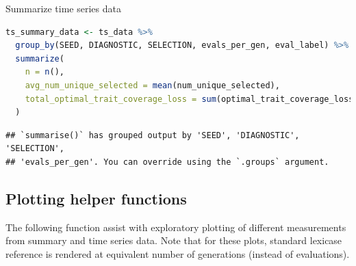 \documentclass[
]{book}
\begin{document}
Summarize time series data

\begin{lstlisting}[language=R]
ts_summary_data <- ts_data %>%
  group_by(SEED, DIAGNOSTIC, SELECTION, evals_per_gen, eval_label) %>%
  summarize(
    n = n(),
    avg_num_unique_selected = mean(num_unique_selected),
    total_optimal_trait_coverage_loss = sum(optimal_trait_coverage_loss)
  )
\end{lstlisting}

\begin{lstlisting}
## `summarise()` has grouped output by 'SEED', 'DIAGNOSTIC', 'SELECTION',
## 'evals_per_gen'. You can override using the `.groups` argument.
\end{lstlisting}

\hypertarget{plotting-helper-functions-2}{%
\subsection{Plotting helper functions}\label{plotting-helper-functions-2}}

The following function assist with exploratory plotting of different measurements from summary and time series data.
Note that for these plots, standard lexicase reference is rendered at equivalent number of generations (instead of evaluations).
\end{document}
